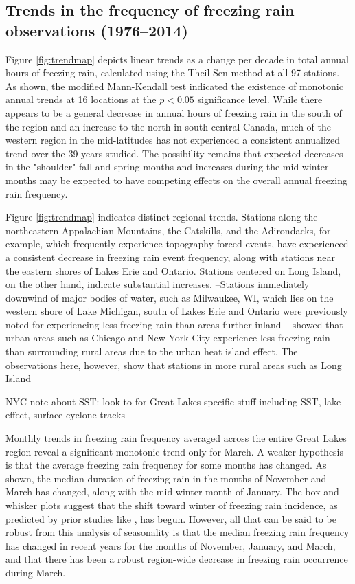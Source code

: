 \documentclass[twocol]{ametsoc}
\begin{document}
\subsection{Trends in the frequency of freezing rain observations (1976--2014)}


Figure \ref{fig:trendmap} depicts linear trends as a change per decade in total annual hours of freezing rain, calculated using the Theil-Sen method at all 97 stations. As shown, the modified Mann-Kendall test indicated the existence of monotonic annual trends at 16 locations at the $p<0.05$ significance level. While there appears to be a general decrease in annual hours of freezing rain in the south of the region and an increase to the north in south-central Canada, much of the western region in the mid-latitudes has not experienced a consistent annualized trend over the 39 years studied. The possibility remains that expected decreases in the "shoulder" fall and spring months and increases during the mid-winter months may be expected to have competing effects on the overall annual freezing rain frequency.

Figure \ref{fig:trendmap} indicates distinct regional trends. Stations along the northeastern Appalachian Mountains, the Catskills, and the Adirondacks, for example, which frequently experience topography-forced events, have experienced a consistent decrease in freezing rain event frequency, along with stations near the eastern shores of Lakes Erie and Ontario. Stations centered on Long Island, on the other hand, indicate substantial increases. 
--Stations immediately downwind of major bodies of water, such as Milwaukee, WI, which lies on the western shore of Lake Michigan, 
south of Lakes Erie and Ontario were previously noted for experiencing less freezing rain than areas further inland 
--\citet{changnon2003urban} showed that urban areas such as Chicago and New York City experience less freezing rain than surrounding rural areas due to the urban heat island effect. The observations here, however, show that stations in more rural areas such as Long Island 

NYC note about SST: \citet{ramos2006sensitivity}
look to \citet{cortinas2000climatology} for Great Lakes-specific stuff including SST, lake effect, surface cyclone tracks

Monthly trends in freezing rain frequency averaged across the entire Great Lakes region reveal a significant monotonic trend only for March. A weaker hypothesis is that the average freezing rain frequency for some months has changed. As shown, the median duration of freezing rain in the months of November and March has changed, along with the mid-winter month of January. The box-and-whisker plots suggest that the shift toward winter of freezing rain incidence, as predicted by prior studies like \citet{cheng2011possible}, has begun. However, all that can be said to be robust from this analysis of seasonality is that the median freezing rain frequency has changed in recent years for the months of November, January, and March, and that there has been a robust region-wide decrease in freezing rain occurrence during March.
\end{document}
